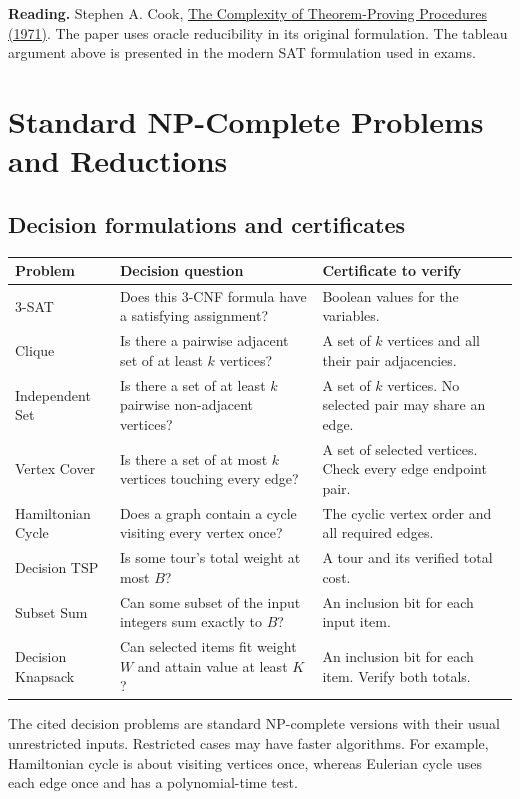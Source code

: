 \documentclass[12pt,a4paper]{article}
\begin{document}
\textbf{Reading.} Stephen A. Cook, \href{https://www.cs.cmu.edu/~15455/resources/Cook1971-complx-thm-proof.pdf}{The Complexity of Theorem-Proving Procedures (1971)}. The paper uses oracle reducibility in its original formulation. The tableau argument above is presented in the modern SAT formulation used in exams.

\section{Standard NP-Complete Problems and Reductions}
\subsection{Decision formulations and certificates}
\par\vspace{5pt}
\begingroup
\setlength{\extrarowheight}{1pt}
\noindent\begin{tabularx}{\linewidth}{|B{3.4cm}|Y|Y|}
\hline
\textbf{Problem} & \textbf{Decision question} & \textbf{Certificate to verify} \\ -SAT & Does this 3-CNF formula have a satisfying assignment? & Boolean values for the variables. \\ \hline
Clique & Is there a pairwise adjacent set of at least $k$ vertices? & A set of $k$ vertices and all their pair adjacencies. \\ \hline
Independent Set & Is there a set of at least $k$ pairwise non-adjacent vertices? & A set of $k$ vertices. No selected pair may share an edge. \\ \hline
Vertex Cover & Is there a set of at most $k$ vertices touching every edge? & A set of selected vertices. Check every edge endpoint pair. \\ \hline
Hamiltonian Cycle & Does a graph contain a cycle visiting every vertex once? & The cyclic vertex order and all required edges. \\ \hline
Decision TSP & Is some tour's total weight at most $B$? & A tour and its verified total cost. \\ \hline
Subset Sum & Can some subset of the input integers sum exactly to $B$? & An inclusion bit for each input item. \\ \hline
Decision Knapsack & Can selected items fit weight $W$ and attain value at least $K$? & An inclusion bit for each item. Verify both totals. \\ \hline
\end{tabularx}\par
\endgroup
The cited decision problems are standard NP-complete versions with their usual unrestricted inputs. Restricted cases may have faster algorithms. For example, Hamiltonian cycle is about visiting vertices once, whereas Eulerian cycle uses each edge once and has a polynomial-time test.
\end{document}
